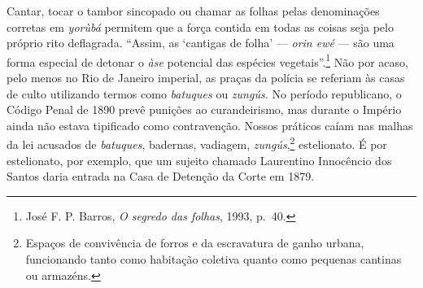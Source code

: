 Cantar, tocar o tambor sincopado ou chamar as folhas pelas denominações
corretas em \textit{yorùbá} permitem que a força contida em todas as
coisas seja pelo próprio rito deflagrada. ``Assim, as `cantigas de
folha' --- \textit{orin ewé} --- são uma forma especial de detonar o
\textit{àse} potencial das espécies vegetais''.\footnote{José F. P.
  Barros, \textit{O segredo das folhas}, 1993, p.~40.} Não por acaso, pelo
menos no Rio de Janeiro imperial, as praças da polícia se referiam às
casas de culto utilizando termos como \textit{batuques} ou \textit{zungús.}
No período republicano, o Código Penal de 1890 prevê punições ao
curandeirismo, mas durante o Império ainda não estava tipificado como
contravenção. Nossos práticos caíam nas malhas da lei acusados de
\textit{batuques}, badernas, vadiagem, \textit{zungús},\footnote{Espaços de
  convivência de forros e da escravatura de ganho urbana, funcionando
  tanto como habitação coletiva quanto como pequenas cantinas ou
  armazéns.} estelionato. É por estelionato, por exemplo, que um sujeito
chamado Laurentino Innocêncio dos Santos daria entrada na Casa de
Detenção da Corte em 1879.

